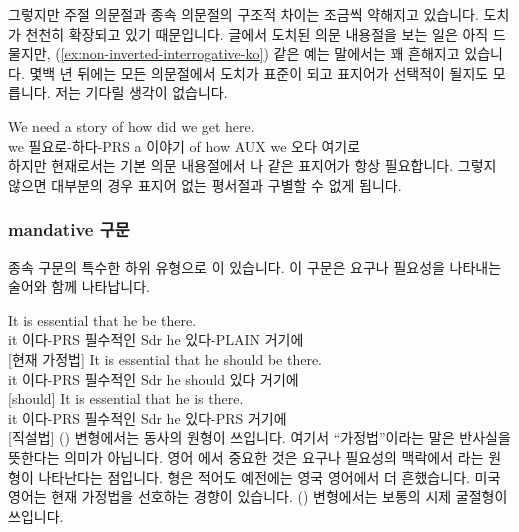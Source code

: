 그렇지만 주절 의문절과 종속 의문절의 구조적 차이는 조금씩 약해지고 있습니다. 도치가 천천히 확장되고 있기 때문입니다. 글에서 도치된 의문 내용절을 보는 일은 아직 드물지만, (\ref{ex:non-inverted-interrogative-ko}) 같은 예는 말에서는 꽤 흔해지고 있습니다. 몇백 년 뒤에는 모든 의문절에서 도치가 표준이 되고 표지어가 선택적이 될지도 모릅니다. 저는 기다릴 생각이 없습니다.

\ea\label{ex:non-inverted-interrogative-ko}
\gll We need a story of {\ob}how did we get here{\cb}.\\
    we 필요로-하다-PRS a 이야기 of how AUX we 오다 여기로\\
\glt {}
\z
하지만 현재로서는 기본 의문 내용절에서 나  같은 표지어가 항상 필요합니다. 그렇지 않으면 대부분의 경우 표지어 없는 평서절과 구별할 수 없게 됩니다.

\subsubsection*{mandative 구문}

종속 구문의 특수한 하위 유형으로 이 있습니다. 이 구문은 요구나 필요성을 나타내는 술어와 함께 나타납니다.

\ea \label{ex:mandative-ko}
    \ea \gll It is essential {\ob}that he be there{\cb}.\\
        it 이다-PRS 필수적인 Sdr he 있다-PLAIN 거기에\\
    \glt {} [현재 가정법]
    \ex \gll It is essential {\ob}that he should be there{\cb}.\\
        it 이다-PRS 필수적인 Sdr he should 있다 거기에\\
    \glt {} [should]
    \ex \gll It is essential {\ob}that he is there{\cb}.\\
        it 이다-PRS 필수적인 Sdr he 있다-PRS 거기에\\
    \glt {} [직설법]
    \z
\z
{}() 변형에서는 동사의 원형이 쓰입니다. 여기서 \enquote{가정법}이라는 말은 반사실을 뜻한다는 의미가 아닙니다. 영어 에서 중요한 것은 요구나 필요성의 맥락에서 라는 원형이 나타난다는 점입니다. 형은 적어도 예전에는 영국 영어에서 더 흔했습니다. 미국 영어는 현재 가정법을 선호하는 경향이 있습니다. () 변형에서는 보통의 시제 굴절형이 쓰입니다.

